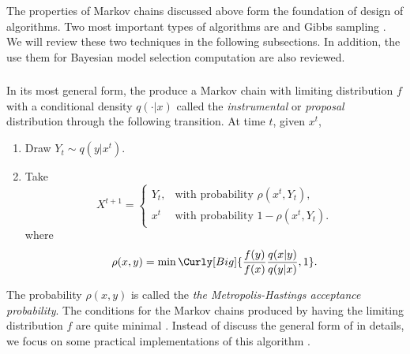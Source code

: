 The properties of Markov chains discussed above form the foundation of design
of \mcmc algorithms. Two most important types of \mcmc algorithms are \mha
\parencite{Hastings:1970gd,Metropolis:1953ex} and Gibbs sampling
\parencite{Geman1993}. We will review these two techniques in the following
subsections. In addition, the use them for Bayesian model selection
computation are also reviewed.

\subsubsection{\mha}
\label{ssub:mha}

In its most general form, the \mha produce a Markov chain with limiting
distribution $f$ with a conditional density $q(\cdot|x)$ called the
\emph{instrumental} or \emph{proposal} distribution through the following
transition. At time $t$, given $x^t$,
\begin{enumerate}
  \item Draw $Y_t \sim q(y|x^t)$.
  \item Take
    \[
      X^{t+1} = \begin{cases}
        Y_t, &\text{with probability } \rho(x^t,Y_t),\\
        x^t  &\text{with probability } 1 - \rho(x^t,Y_t).
      \end{cases}
    \]
    where
    \begin{equation}
      \rho(x,y) = \min\Curly[Big]{\frac{f(y)}{f(x)}\frac{q(x|y)}{q(y|x)},1}.
    \end{equation}
\end{enumerate}
The probability $\rho(x,y)$ is called the \emph{the Metropolis-Hastings
  acceptance probability}. The conditions for the Markov chains produced by
\mha having the limiting distribution $f$ are quite minimal
\parencite[see][chap.~7]{Robert2004}. Instead of discuss the general form of
\mha in details, we focus on some practical implementations of this algorithm
\parencite[also see][for the speed of convergence of the \mha]{Mengersen:1996th}.

